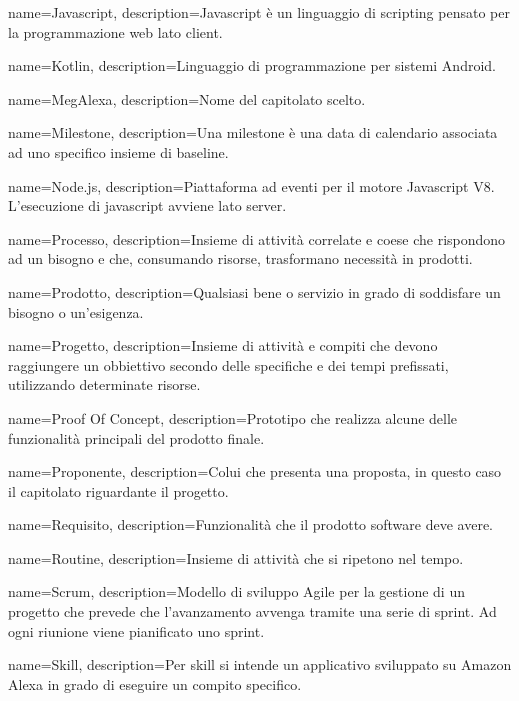{
name={Javascript},
description={Javascript è un linguaggio di scripting pensato per la programmazione web lato client.}
}

{
name={Kotlin},
description={Linguaggio di programmazione per sistemi Android.}
}

{
name={MegAlexa},
description={Nome del capitolato scelto.}
}

{
name={Milestone},
description={Una milestone è una data di calendario associata ad uno specifico insieme di baseline.}
}

{
name={Node.js},
description={Piattaforma ad eventi per il motore Javascript V8. L’esecuzione di javascript avviene lato server.}
}

{
name={Processo},
description={Insieme di attività correlate e coese che rispondono ad un bisogno e che, consumando risorse, trasformano necessità in prodotti.}
}

{
name={Prodotto},
description={Qualsiasi bene o servizio in grado di soddisfare un bisogno o un’esigenza.}
}

{
name={Progetto},
description={Insieme di attività e compiti che devono raggiungere un obbiettivo secondo delle specifiche e dei tempi prefissati, utilizzando determinate risorse.}
}

{
	name={Proof Of Concept},
	description={Prototipo che realizza alcune delle funzionalità principali del prodotto finale.}
}

{
name={Proponente},
description={Colui che presenta una proposta, in questo caso il capitolato riguardante il progetto.}
}

{
name={Requisito},
description={Funzionalità che il prodotto software deve avere.}
}

{
name={Routine},
description={Insieme di attività che si ripetono nel tempo.}
}

{
name={Scrum},
description={Modello di sviluppo Agile per la gestione di un progetto che prevede che l’avanzamento avvenga tramite una serie di sprint. Ad ogni riunione viene pianificato uno sprint.}
}

{
name={Skill},
description={Per skill si intende un applicativo sviluppato su Amazon Alexa in grado di eseguire un compito specifico.}
}

